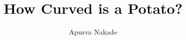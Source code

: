 

% 

\title{How Curved is a Potato?}
\author{\small{Apurva Nakade}}
\date{}

\maketitle
\tableofcontents






% 


